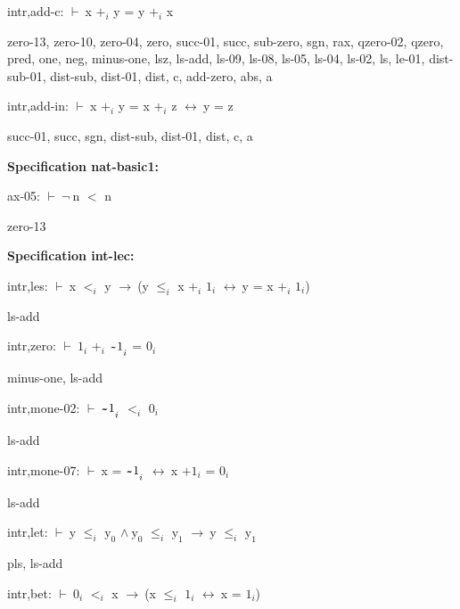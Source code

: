 \documentclass[a4paper]{article}
\newcommand{\tildesym}{\raisebox{-4pt}{\bf\~{}}}
\newcommand{\Fol}{\mbox{$\vdash\ $}}
\newcommand{\Not}{\mbox{$\neg\ $}}
\newcommand{\And}{\mbox{$\wedge\ $}}
\newcommand{\Imp}{\mbox{$\rightarrow\ $}}
\newcommand{\Equiv}{\mbox{$\leftrightarrow\ $}}
\begin{document}
intr,add-c: 
 \Fol x $\mbox{+}_{i}$ y = y $\mbox{+}_{i}$ x



zero-13, zero-10, zero-04, zero, succ-01, succ, sub-zero, sgn, rax, qzero-02, qzero, pred, one, neg, minus-one, lsz, ls-add, ls-09, ls-08, ls-05, ls-04, ls-02, ls, le-01, dist-sub-01, dist-sub, dist-01, dist, c, add-zero, abs, a

\bigskip

intr,add-in: 
 \Fol x $\mbox{+}_{i}$ y = x $\mbox{+}_{i}$ z \Equiv y = z



succ-01, succ, sgn, dist-sub, dist-01, dist, c, a

\bigskip

{\bf Specification nat-basic1:}

ax-05: 
 \Fol \Not n $<$ n



zero-13

\bigskip

{\bf Specification int-lec:}

intr,les: 
 \Fol x $\mbox{$<$}_{i}$ y \Imp (y $\mbox{$\le$}_{i}$ x $\mbox{+}_{i}$ $\mbox{1}_{i}$ \Equiv y = x $\mbox{+}_{i}$ $\mbox{1}_{i}$)



ls-add

\bigskip

intr,zero: 
 \Fol $\mbox{1}_{i}$ $\mbox{+}_{i}$ $\mbox{$\tildesym$1}_{i}$ = $\mbox{0}_{i}$



minus-one, ls-add

\bigskip

intr,mone-02: 
 \Fol $\mbox{$\tildesym$1}_{i}$ $\mbox{$<$}_{i}$ $\mbox{0}_{i}$



ls-add

\bigskip

intr,mone-07: 
 \Fol x = $\mbox{$\tildesym$1}_{i}$ \Equiv x $\mbox{+1}_{i}$ = $\mbox{0}_{i}$



ls-add

\bigskip

intr,let: 
 \Fol y $\mbox{$\le$}_{i}$ $\mbox{y}_{0}$ \And $\mbox{y}_{0}$ $\mbox{$\le$}_{i}$ $\mbox{y}_{1}$ \Imp y $\mbox{$\le$}_{i}$ $\mbox{y}_{1}$



pls, ls-add

\bigskip

intr,bet: 
 \Fol $\mbox{0}_{i}$ $\mbox{$<$}_{i}$ x \Imp (x $\mbox{$\le$}_{i}$ $\mbox{1}_{i}$ \Equiv x = $\mbox{1}_{i}$)
\end{document}
